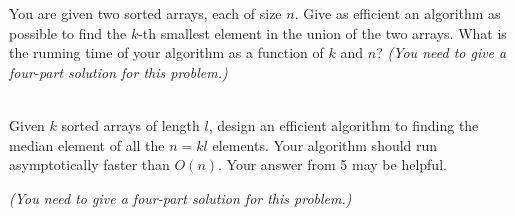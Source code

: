 \begin{qunlist}
You are given two sorted arrays, each of size $n$. Give as efficient an algorithm as possible to find the $k$-th smallest element in the union of the two arrays. What is the running time of your algorithm as a function of $k$ and $n$?
{\em (You need to give a four-part solution for this problem.)}

\answer{}


 \\
Given $k$ sorted arrays of length $l$, design an efficient algorithm to finding the median element of all the $n=kl$ elements. Your algorithm should run  asymptotically faster than $O(n)$. Your answer from 5 may be helpful.

{\em (You need to give a four-part solution for this problem.)}

\answer{}


\end{qunlist}
